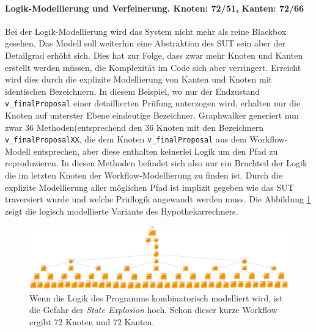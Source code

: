 \paragraph{Logik-Modellierung und Verfeinerung. Knoten: 72/51, Kanten: 72/66}
Bei der Logik-Modellierung wird das System nicht mehr als reine Blackbox gesehen. Das Modell soll weiterhin eine Abstraktion des \Gls{SUT} sein aber der Detailgrad erhöht sich. Dies hat zur Folge, dass zwar mehr Knoten und Kanten erstellt werden müssen, die Komplexität im Code sich aber verringert. Erreicht wird dies durch die explizite Modellierung von Kanten und Knoten mit identischen Bezeichnern. In diesem Beispiel, wo nur der Endzustand \texttt{v\_finalProposal} einer detaillierten Prüfung unterzogen wird, erhalten nur die Knoten auf unterster Ebene eindeutige Bezeichner. Graphwalker generiert nun zwar 36 Methoden(entsprechend den 36 Knoten mit den Bezeichnern \texttt{v\_finalProposalXX}, die dem Knoten \texttt{v\_finalProposal} aus dem Workflow-Modell entsprechen, aber diese enthalten keinerlei Logik um den Pfad zu reproduzieren. In diesen Methoden befindet sich also nur ein Bruchteil der Logik die im letzten Knoten der Workflow-Modellierung zu finden ist. Durch die explizite Modellierung aller möglichen Pfad ist implizit gegeben wie das \Gls{SUT} traversiert wurde und welche Prüflogik angewandt werden muss. Die Abbildung \ref{fig:modell_komplex} zeigt die logisch modellierte Variante des Hypothekarrechners.

\begin{figure}[h] 
  \centering
     \includegraphics[width=1.5\textwidth, angle=90]{figures/modell_komplex.png}
  \caption{Wenn die Logik des Programms kombinatorisch modelliert wird, ist die Gefahr der \textit{State Explosion} hoch. Schon dieser kurze Workflow ergibt 72 Knoten und 72 Kanten.}
  \label{fig:modell_komplex}
\end{figure}

